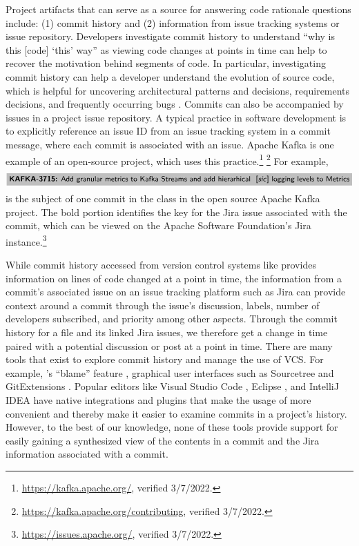 Project artifacts that can serve as a source for answering code rationale questions include: (1) commit history and (2) information from issue tracking systems or issue repository. 
Developers investigate commit history to understand ``why is this [code] ‘this’ way'' as viewing code changes at points in time can help to recover the motivation behind segments of code.
In particular, investigating commit history can help a developer understand the evolution of source code, which is helpful for uncovering architectural patterns and decisions, requirements decisions, and frequently occurring bugs \cite{codoban_software_2015}.
Commits can also be accompanied by issues in a project issue repository. 
A typical practice in software development is to explicitly reference an issue ID from an issue tracking system in a commit message, where each commit is associated with an issue. Apache Kafka is one example of an open-source project, which uses this practice.\footnote{\url{https://kafka.apache.org/}, verified 3/7/2022.} \footnote{\url{https://kafka.apache.org/contributing}, verified 3/7/2022.}
For example, 
$$
\colorbox{lightgray}{\jira{KAFKA-3715:}{Add granular metrics to Kafka Streams and add hierarhical \sic logging levels to Metrics}}
$$
is the subject of one commit in the  class in the open source Apache Kafka project. The bold portion identifies the key for the Jira issue associated with the commit, which can be viewed on the Apache Software Foundation's Jira instance.\footnote{\url{https://issues.apache.org/}, verified 3/7/2022.}

While commit history accessed from version control systems like  provides information on lines of code changed at a point in time, the information from a commit's associated issue on an issue tracking platform such as Jira \cite{jira} can provide context around a commit through the issue's discussion, labels, number of developers subscribed, and priority among other aspects.
Through the commit history for a file and its linked Jira issues, we therefore get a change in time paired with a potential discussion or post at a point in time.
There are many tools that exist to explore commit history and manage the use of VCS. 
For example, 's ``blame'' feature \cite{gitblame}, graphical user interfaces such as Sourcetree \cite{sourcetree} and GitExtensions \cite{gitextensions}. 
Popular editors like Visual Studio Code \cite{vscode}, Eclipse \cite{eclipse}, and IntelliJ IDEA \cite{intellij} have native  integrations and plugins that make the usage of  more convenient and thereby make it easier to examine commits in a project's history. 
However, to the best of our knowledge, none of these tools provide support for easily gaining a synthesized view of the contents in a commit and the Jira information associated with a commit.

